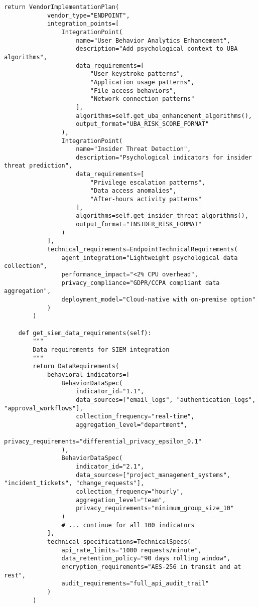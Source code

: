 \documentclass[10pt,twocolumn]{IEEEtran}
\begin{document}
\begin{lstlisting}[caption={Vendor Integration Framework}]
        return VendorImplementationPlan(
            vendor_type="ENDPOINT",
            integration_points=[
                IntegrationPoint(
                    name="User Behavior Analytics Enhancement",
                    description="Add psychological context to UBA algorithms",
                    data_requirements=[
                        "User keystroke patterns",
                        "Application usage patterns", 
                        "File access behaviors",
                        "Network connection patterns"
                    ],
                    algorithms=self.get_uba_enhancement_algorithms(),
                    output_format="UBA_RISK_SCORE_FORMAT"
                ),
                IntegrationPoint(
                    name="Insider Threat Detection",
                    description="Psychological indicators for insider threat prediction",
                    data_requirements=[
                        "Privilege escalation patterns",
                        "Data access anomalies",
                        "After-hours activity patterns"
                    ],
                    algorithms=self.get_insider_threat_algorithms(),
                    output_format="INSIDER_RISK_FORMAT"
                )
            ],
            technical_requirements=EndpointTechnicalRequirements(
                agent_integration="Lightweight psychological data collection",
                performance_impact="<2% CPU overhead",
                privacy_compliance="GDPR/CCPA compliant data aggregation",
                deployment_model="Cloud-native with on-premise option"
            )
        )
    
    def get_siem_data_requirements(self):
        """
        Data requirements for SIEM integration
        """
        return DataRequirements(
            behavioral_indicators=[
                BehaviorDataSpec(
                    indicator_id="1.1",
                    data_sources=["email_logs", "authentication_logs", "approval_workflows"],
                    collection_frequency="real-time",
                    aggregation_level="department",
                    privacy_requirements="differential_privacy_epsilon_0.1"
                ),
                BehaviorDataSpec(
                    indicator_id="2.1", 
                    data_sources=["project_management_systems", "incident_tickets", "change_requests"],
                    collection_frequency="hourly",
                    aggregation_level="team",
                    privacy_requirements="minimum_group_size_10"
                )
                # ... continue for all 100 indicators
            ],
            technical_specifications=TechnicalSpecs(
                api_rate_limits="1000 requests/minute",
                data_retention_policy="90 days rolling window",
                encryption_requirements="AES-256 in transit and at rest",
                audit_requirements="full_api_audit_trail"
            )
        )
\end{lstlisting}
\end{document}
